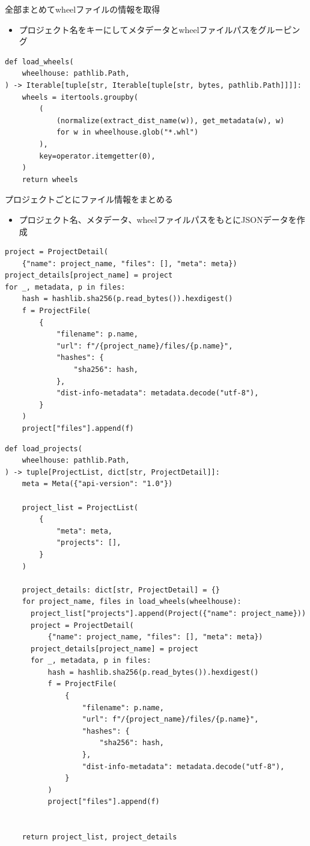 \documentclass[presentation]{beamer}
\begin{document}
\begin{frame}[label={sec:org627dfab},fragile]{全部まとめてwheelファイルの情報を取得}
 \begin{itemize}
\item プロジェクト名をキーにしてメタデータとwheelファイルパスをグルーピング
\end{itemize}

\begin{verbatim}
def load_wheels(
    wheelhouse: pathlib.Path,
) -> Iterable[tuple[str, Iterable[tuple[str, bytes, pathlib.Path]]]]:
    wheels = itertools.groupby(
        (
            (normalize(extract_dist_name(w)), get_metadata(w), w)
            for w in wheelhouse.glob("*.whl")
        ),
        key=operator.itemgetter(0),
    )
    return wheels
\end{verbatim}
\end{frame}
\begin{frame}[label={sec:org19bfd7a},fragile]{プロジェクトごとにファイル情報をまとめる}
 \begin{itemize}
\item プロジェクト名、メタデータ、wheelファイルパスをもとにJSONデータを作成
\end{itemize}


\begin{verbatim}
project = ProjectDetail(
    {"name": project_name, "files": [], "meta": meta})
project_details[project_name] = project
for _, metadata, p in files:
    hash = hashlib.sha256(p.read_bytes()).hexdigest()
    f = ProjectFile(
        {
            "filename": p.name,
            "url": f"/{project_name}/files/{p.name}",
            "hashes": {
                "sha256": hash,
            },
            "dist-info-metadata": metadata.decode("utf-8"),
        }
    )
    project["files"].append(f)

\end{verbatim}
\begin{verbatim}
def load_projects(
    wheelhouse: pathlib.Path,
) -> tuple[ProjectList, dict[str, ProjectDetail]]:
    meta = Meta({"api-version": "1.0"})

    project_list = ProjectList(
        {
            "meta": meta,
            "projects": [],
        }
    )

    project_details: dict[str, ProjectDetail] = {}
    for project_name, files in load_wheels(wheelhouse):
      project_list["projects"].append(Project({"name": project_name}))
      project = ProjectDetail(
          {"name": project_name, "files": [], "meta": meta})
      project_details[project_name] = project
      for _, metadata, p in files:
          hash = hashlib.sha256(p.read_bytes()).hexdigest()
          f = ProjectFile(
              {
                  "filename": p.name,
                  "url": f"/{project_name}/files/{p.name}",
                  "hashes": {
                      "sha256": hash,
                  },
                  "dist-info-metadata": metadata.decode("utf-8"),
              }
          )
          project["files"].append(f)


    return project_list, project_details

\end{verbatim}
\end{frame}
\end{document}
